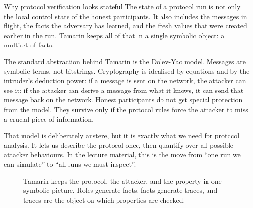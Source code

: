 \begin{intermezzo}{Why protocol verification looks stateful}
The state of a protocol run is not only the local control state of the honest
participants.  It also includes the messages in flight, the facts the
adversary has learned, and the fresh values that were created earlier in the
run.  Tamarin keeps all of that in a single symbolic object: a multiset of
facts.
\end{intermezzo}

The standard abstraction behind Tamarin is the Dolev-Yao model.  Messages are
symbolic terms, not bitstrings.  Cryptography is idealised by equations and by
the intruder's deduction power: if a message is sent on the network, the
attacker can see it; if the attacker can derive a message from what it knows,
it can send that message back on the network.  Honest participants do not get
special protection from the model.  They survive only if the protocol rules
force the attacker to miss a crucial piece of information.

That model is deliberately austere, but it is exactly what we need for
protocol analysis.  It lets us describe the protocol once, then quantify over
all possible attacker behaviours.  In the lecture material, this is the move
from ``one run we can simulate'' to ``all runs we must inspect''.

\begin{figure}[ht]
  \centering
  \caption{Tamarin keeps the protocol, the attacker, and the property in one
           symbolic picture.  Roles generate facts, facts generate traces, and
           traces are the object on which properties are checked.}
  \label{fig:tamarin-overview}
\end{figure}

